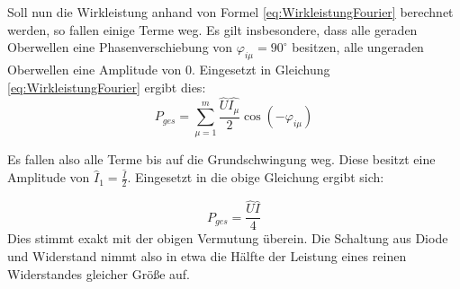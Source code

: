 Soll nun die Wirkleistung anhand von Formel \eqref{eq:WirkleistungFourier} berechnet werden, so fallen einige Terme weg. Es gilt insbesondere, dass alle geraden Oberwellen eine Phasenverschiebung von $\varphi_{i\mu} = 90^\circ$ besitzen, alle ungeraden Oberwellen eine Amplitude von 0. Eingesetzt in Gleichung \eqref{eq:WirkleistungFourier} ergibt dies:
\begin{equation}
P_{ges} = \sum_{\mu=1}^m\frac{\hat{U}\hat{I_\mu}}{2}\cos(-\varphi_{i\mu})
\end{equation}

Es fallen also alle Terme bis auf die Grundschwingung weg. Diese besitzt eine Amplitude von $\hat{I}_{1}=\frac{\hat{I}}{2}$. Eingesetzt in die obige Gleichung ergibt sich:

\begin{equation}
P_{ges} = \frac{\hat{U}\hat{I}}{4}
\end{equation}
Dies stimmt exakt mit der obigen Vermutung überein. Die Schaltung aus Diode und Widerstand nimmt also in etwa die Hälfte der Leistung eines reinen Widerstandes gleicher Größe auf.

\newpage